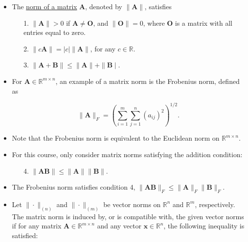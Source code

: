 \documentclass[12pt,thmsa]{article}
\begin{document}
\begin{itemize}
	\item The \underline{norm of a matrix} \(\boldsymbol{A}\), denoted by \(\| \boldsymbol{A} \|\), satisfies
	
	\begin{itemize}
	\item[1.] \(\|\boldsymbol{A}\|>0\) if \(\boldsymbol{A} \neq \boldsymbol{O}\), and \(\|\boldsymbol{O}\|=0\), where \(\boldsymbol{O}\) is a matrix with all entries equal to zero.
	
	\item[2.]  \(\|c \boldsymbol{A}\|=|c|\|\boldsymbol{A}\|\), for any \(c \in \mathbb{R}\).
	
	\item[3.]  \(\|\boldsymbol{A}+\boldsymbol{B}\| \leq\|\boldsymbol{A}\|+\| \boldsymbol{B} \mid\).
	
	\end{itemize}

	\item For \(\boldsymbol{A} \in \mathbb{R}^{m \times n}\), an example of a matrix norm is the Frobenius norm, defined as
	
	\begin{equation*}
		\|\boldsymbol{A}\|_{F}=\left(\sum_{i=1}^{m} \sum_{j=1}^{n}\left(a_{i j}\right)^{2}\right)^{1 / 2}.
	\end{equation*}
	
	\item Note that the Frobenius norm is equivalent to the Euclidean norm on \(\mathbb{R}^{m \times n}\).
	
	\item For this course, only consider matrix norms satisfying the addition condition:
	
	\begin{itemize}
		\item[4.]\(\|\boldsymbol{A B}\| \leq\|\boldsymbol{A}\|\|\boldsymbol{B}\|\).
	\end{itemize}

	\item The Frobenius norm satisfies condition 4, \(\|\boldsymbol{A B}\|_{F} \leq\|\boldsymbol{A}\|_{F} \|\boldsymbol{B}\|_{F} \).
	
	\item Let \(\|\cdot\|_{(n)}\) and \(\|\cdot\|_{(m)}\) be vector norms on \(\mathbb{R}^{n}\) and \(\mathbb{R}^{m}\), respectively. The matrix norm is induced by, or is compatible with, the given vector norms if for any matrix \(\boldsymbol{A} \in \mathbb{R}^{m \times n}\) and any vector \(\boldsymbol{x} \in \mathbb{R}^{n}\), the following inequality is satisfied:
	

\end{itemize}
\end{document}
